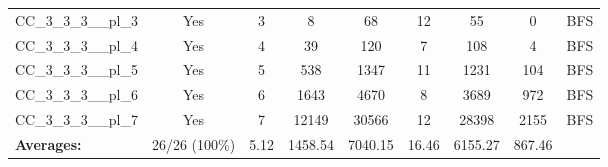 \documentclass{article}
\begin{document}
\begin{tabular}{lcccccccc}
CC\_3\_3\_3\_\_pl\_3 & Yes & 3 & 8 & 68 & 12 & 55 & 0 & BFS \\
CC\_3\_3\_3\_\_pl\_4 & Yes & 4 & 39 & 120 & 7 & 108 & 4 & BFS \\
CC\_3\_3\_3\_\_pl\_5 & Yes & 5 & 538 & 1347 & 11 & 1231 & 104 & BFS \\
CC\_3\_3\_3\_\_pl\_6 & Yes & 6 & 1643 & 4670 & 8 & 3689 & 972 & BFS \\
CC\_3\_3\_3\_\_pl\_7 & Yes & 7 & 12149 & 30566 & 12 & 28398 & 2155 & BFS \\
\textbf{Averages:} & 26/26 (100\%) & 5.12 & 1458.54 & 7040.15 & 16.46 & 6155.27 & 867.46 & \\
\bottomrule
\end{tabular}
\\[0.7cm]
\end{document}
